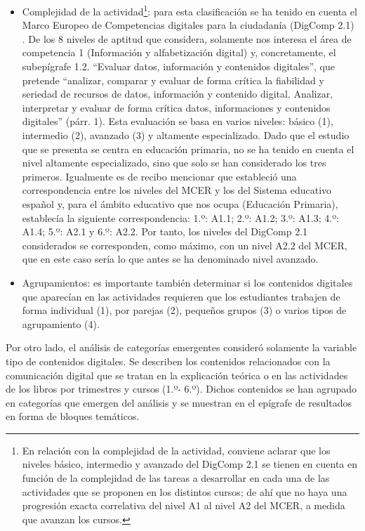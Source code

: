 \documentclass{textolivre}
\begin{document}
\begin{itemize}
    \item Complejidad de la actividad\footnote{En relación con la complejidad de la actividad, conviene aclarar que los niveles básico, intermedio y avanzado del DigComp 2.1 \cite{carretero_2018} se tienen en cuenta en función de la complejidad de las tareas a desarrollar en cada una de las actividades que se proponen en los distintos cursos; de ahí que no haya una progresión exacta correlativa del nivel A1 al nivel A2 del MCER, a medida que avanzan los cursos.}: para esta clasificación se ha tenido en cuenta el Marco Europeo de Competencias digitales para la ciudadanía (DigComp 2.1) \cite{carretero_2018}. De los 8 niveles de aptitud que considera, solamente nos interesa el área de competencia 1 (Información y alfabetización digital) y, concretamente, el subepígrafe 1.2. “Evaluar datos, información y contenidos digitales”, que pretende “analizar, comparar y evaluar de forma crítica la fiabilidad y seriedad de recursos de datos, información y contenido digital. Analizar, interpretar y evaluar de forma crítica datos, informaciones y contenidos digitales” (párr. 1). Esta evaluación se basa en varios niveles: básico (1), intermedio (2), avanzado (3) y altamente especializado. Dado que el estudio que se presenta se centra en educación primaria, no se ha tenido en cuenta el nivel altamente especializado, sino que solo se han considerado los tres primeros. Igualmente es de recibo mencionar que \textcite{gisbert_da_cruz_niveles_2011} estableció una correspondencia entre los niveles del MCER y los del Sistema educativo español y, para el ámbito educativo que nos ocupa (Educación Primaria), establecía la siguiente correspondencia: 1.º: A1.1; 2.º: A1.2; 3.º: A1.3; 4.º: A1.4; 5.º: A2.1 y 6.º: A2.2. Por tanto, los niveles del DigComp 2.1 considerados se corresponden, como máximo, con un nivel A2.2 del MCER, que en este caso sería lo que antes se ha denominado nivel avanzado.
    \item Agrupamientos: es importante también determinar si los contenidos digitales que aparecían en las actividades requieren que los estudiantes trabajen de forma individual (1), por parejas (2), pequeños grupos (3) o varios tipos de agrupamiento (4).
\end{itemize}

Por otro lado, el análisis de categorías emergentes consideró solamente la variable tipo de contenidos digitales. Se describen los contenidos relacionados con la comunicación digital que se tratan en la explicación teórica o en las actividades de los libros por trimestres y cursos (1.º- 6.º). Dichos contenidos se han agrupado en categorías que emergen del análisis y se muestran en el epígrafe de resultados en forma de bloques temáticos.
\end{document}
